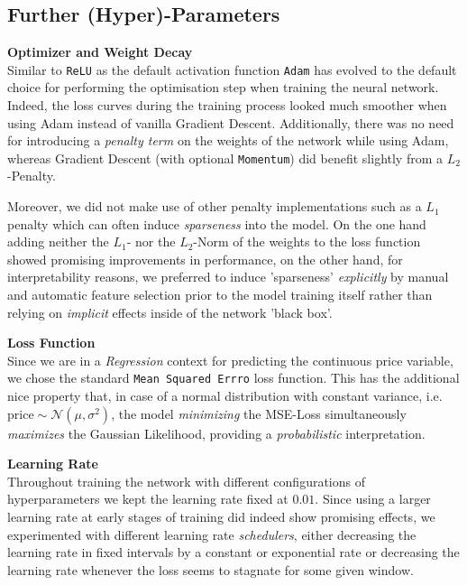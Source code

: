 \documentclass[12pt, letterpaper]{article}
\begin{document}
\subsection{Further (Hyper)-Parameters}

\textbf{Optimizer and Weight Decay} \\
Similar to \texttt{ReLU} as the default activation function \texttt{Adam} has evolved to the default choice for performing the optimisation step when training the neural network.
Indeed, the loss curves during the training process looked much smoother when using Adam instead of vanilla Gradient Descent.
Additionally, there was no need for introducing a \emph{penalty term} on the weights of the network while using Adam, whereas Gradient Descent (with optional \texttt{Momentum}) did benefit slightly from a $L_2$-Penalty.

Moreover, we did not make use of other penalty implementations such as a $L_1$ penalty which can often induce \emph{sparseness} into the model.
On the one hand adding neither the $L_1$- nor the $L_2$-Norm of the weights to the loss function showed promising improvements in performance, on the other hand, for interpretability reasons, we preferred to induce 'sparseness' \emph{explicitly} by manual and automatic feature selection prior to the model training itself rather than relying on \emph{implicit} effects inside of the network 'black box'.

\textbf{Loss Function} \\
Since we are in a \emph{Regression} context for predicting the continuous price variable, we chose the standard \texttt{Mean Squared Errro} loss function.
This has the additional nice property that, in case of a normal distribution with constant variance, i.e. $\text{price} \sim \mathcal{N} \left(\mu, \sigma^2 \right)$, the model \emph{minimizing} the MSE-Loss simultaneously \emph{maximizes} the Gaussian Likelihood, providing a \emph{probabilistic} interpretation.

\textbf{Learning Rate} \\
Throughout training the network with different configurations of hyperparameters we kept the learning rate fixed at $0.01$.
Since using a larger learning rate at early stages of training did indeed show promising effects, we experimented with different learning rate \emph{schedulers}, either decreasing the learning rate in fixed intervals by a constant or exponential rate or decreasing the learning rate whenever the loss seems to stagnate for some given window.
\end{document}
